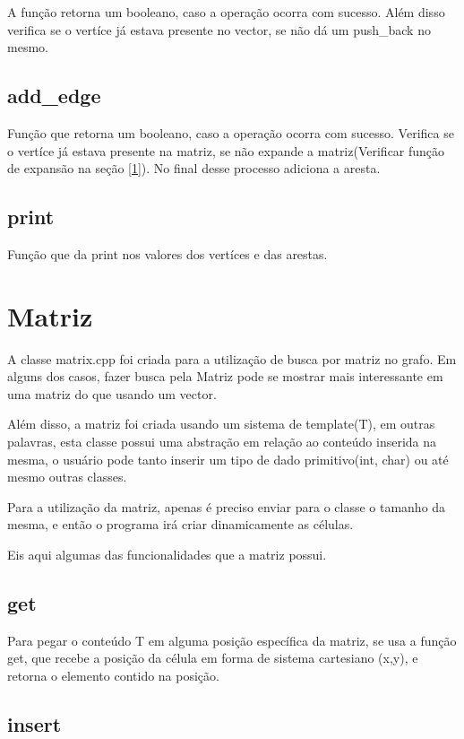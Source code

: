 \documentclass[12pt]{article}
\begin{document}
  A função retorna um booleano, caso a operação ocorra com sucesso. Além disso verifica se o vertíce 
  já estava presente no vector, se não dá um push\_back no mesmo.

  \subsection{add\_edge}

  Função que retorna um booleano, caso a operação ocorra com sucesso. Verifica se o vertíce
  já estava presente na matriz, se não expande a matriz(Verificar função de expansão na seção [\ref{sec:matriz}]).
  No final desse processo adiciona a aresta.  

  \subsection{print}

  Função que da print nos valores dos vertíces e das arestas.

  \section{Matriz} \label{sec:matriz}

  A classe matrix.cpp foi criada para a utilização de busca por matriz no
  grafo. Em alguns dos casos, fazer busca pela Matriz pode se mostrar mais 
  interessante em uma matriz do que usando um vector.

  Além disso, a matriz foi criada usando um sistema de template(T), em outras
  palavras, esta classe possui uma abstração em relação ao conteúdo inserida
  na mesma, o usuário pode tanto inserir um tipo de dado primitivo(int, char) ou até
  mesmo outras classes.

  Para a utilização da matriz, apenas é preciso enviar para o classe o 
  tamanho da mesma, e então o programa irá criar dinamicamente as células.

  Eis aqui algumas das funcionalidades que a matriz possui.

  \subsection{get}

  Para pegar o conteúdo T em alguma posição específica da matriz, se usa 
  a função get, que recebe a posição da célula em forma de sistema cartesiano
  (x,y), e retorna o elemento contido na posição.

  \subsection{insert} 
\end{document}
